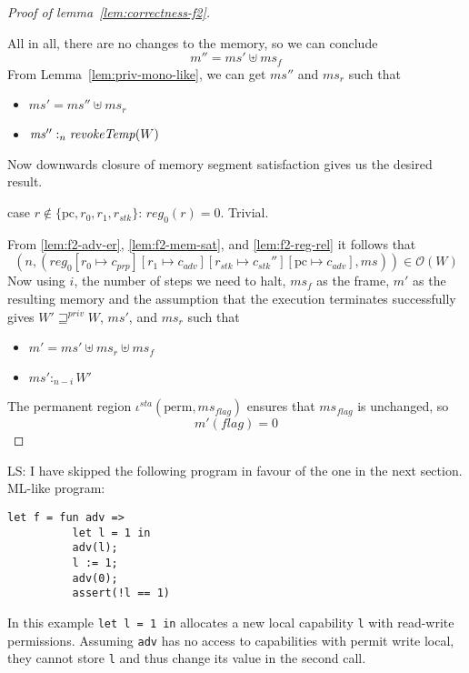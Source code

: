 \documentclass[a4paper]{article}
\newcommand{\update}[2]{[#1 \mapsto #2]}
\newcommand\lau[1]{{\color{purple} \sf \footnotesize {LS: #1}}\\}
\newcommand{\var}[1]{\mathit{#1}}
\newcommand{\hs}{\var{ms}}
\newcommand{\ms}{\hs}
\newcommand{\pcreg}{\mathrm{pc}}
\newcommand{\reg}{\var{reg}}
\newcommand{\heap}{\var{mem}}
\newcommand{\adv}{\var{adv}}
\newcommand{\stk}{\var{stk}}
\newcommand{\flag}{\var{flag}}
\newcommand{\sta}{\var{sta}}
\newcommand{\plainfun}[2]{
  \ifthenelse{\equal{#2}{}}
  {\mathit{#1}}
  {\mathit{#1}(#2)}
}
\newcommand{\revokeTemp}[1]{\plainfun{revokeTemp}{#1}}
\newcommand{\futurestr}{\mathbin{\sqsupseteq}^{\var{priv}}}
\newcommand{\heapSat}[3][\heap]{#1 :_{#2} #3}
\newcommand{\observations}{\mathcal{O}}
\newcommand{\npair}[2][n]{\left(#1,#2 \right)}
\newcommand{\plainview}[1]{\mathrm{#1}}
\newcommand{\perma}{\plainview{perm}}
\begin{document}
\begin{proof}[Proof of lemma~\ref{lem:correctness-f2}]
\begin{enumproof}[resume]
\begin{enumproof}
      All in all, there are no changes to the memory, so we can conclude
      \[
        m'' = \ms' \uplus \ms_f
      \]
      From Lemma~\ref{lem:priv-mono-like}, we can get $\ms''$ and $\ms_r$ such that
      \begin{itemize}
      \item $\ms' = \ms'' \uplus \ms_r$
      \item $\heapSat[\ms'']{n}{\revokeTemp{W}}$
      \end{itemize}
      Now downwards closure of memory segment satisfaction gives us the desired result.
    \item case $r\not\in \{\pcreg,r_0,r_1,r_\stk\}$: $\reg_0(r) = 0$. Trivial.
    \end{enumproof}
  \end{enumproof}
  From \ref{lem:f2-adv-er}, \ref{lem:f2-mem-sat}, and \ref{lem:f2-reg-rel} it follows that
  \[
    \npair{(\reg_0\update{r_0}{c_{\var{prp}}}\update{r_1}{c_\adv}\update{r_\stk}{c_\stk''}\update{\pcreg}{c_\adv},\ms)} \in \observations(W)
  \]
  Now using $i$, the number of steps we need to halt, $\ms_f$ as the frame, $m'$ as the resulting memory and the assumption that the execution terminates successfully gives $W' \futurestr W$, $\ms'$, and $\ms_r$ such that
  \begin{itemize}
  \item $m' = \ms' \uplus\ms_r \uplus \ms_f$
  \item $\heapSat[\ms']{n-i}{W'}$
  \end{itemize}
  The permanent region $\iota^\sta (\perma,\ms_\flag)$ ensures that $\ms_\flag$ is unchanged, so
  \[
    m'(\flag) = 0
  \]
\end{proof}

\lau{I have skipped the following program in favour of the one in the next section. }
              ML-like program:
\begin{verbatim}
let f = fun adv =>
          let l = 1 in
          adv(l);
          l := 1;
          adv(0);
          assert(!l == 1)
\end{verbatim}
              In this example \texttt{let l = 1 in} allocates a new local capability \texttt{l} with read-write permissions. Assuming \texttt{adv} has no access to capabilities with permit write local, they cannot store \texttt{l} and thus change its value in the second call.
\end{document}
